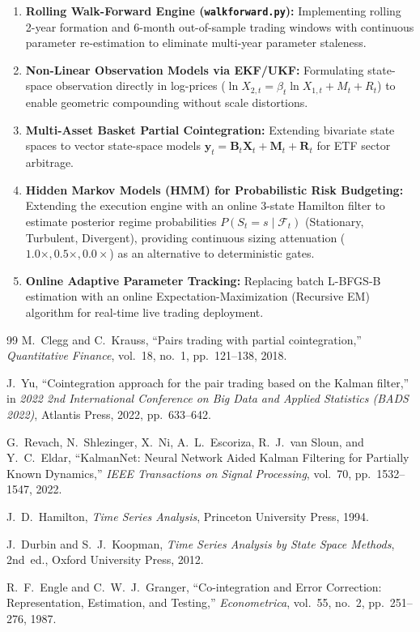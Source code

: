 \documentclass[11pt, a4paper]{article}
\begin{document}
\begin{enumerate}
    \item \textbf{Rolling Walk-Forward Engine (\texttt{walkforward.py}):} Implementing rolling 2-year formation and 6-month out-of-sample trading windows with continuous parameter re-estimation to eliminate multi-year parameter staleness.
    \item \textbf{Non-Linear Observation Models via EKF/UKF:} Formulating state-space observation directly in log-prices ($\ln X_{2,t} = \beta_t \ln X_{1,t} + M_t + R_t$) to enable geometric compounding without scale distortions.
    \item \textbf{Multi-Asset Basket Partial Cointegration:} Extending bivariate state spaces to vector state-space models $\mathbf{y}_t = \mathbf{B}_t \mathbf{X}_t + \mathbf{M}_t + \mathbf{R}_t$ for ETF sector arbitrage.
    \item \textbf{Hidden Markov Models (HMM) for Probabilistic Risk Budgeting:} Extending the execution engine with an online 3-state Hamilton filter to estimate posterior regime probabilities $P(S_t = s \mid \mathcal{F}_t)$ (Stationary, Turbulent, Divergent), providing continuous sizing attenuation ($1.0\times, 0.5\times, 0.0\times$) as an alternative to deterministic gates.
    \item \textbf{Online Adaptive Parameter Tracking:} Replacing batch L-BFGS-B estimation with an online Expectation-Maximization (Recursive EM) algorithm for real-time live trading deployment.
\end{enumerate}

\begin{thebibliography}{99}
M.~Clegg and C.~Krauss, ``Pairs trading with partial cointegration,'' \textit{Quantitative Finance}, vol.~18, no.~1, pp.~121--138, 2018.

J.~Yu, ``Cointegration approach for the pair trading based on the Kalman filter,'' in \textit{2022 2nd International Conference on Big Data and Applied Statistics (BADS 2022)}, Atlantis Press, 2022, pp.~633--642.

G.~Revach, N.~Shlezinger, X.~Ni, A.~L.~Escoriza, R.~J.~van Sloun, and Y.~C.~Eldar, ``KalmanNet: Neural Network Aided Kalman Filtering for Partially Known Dynamics,'' \textit{IEEE Transactions on Signal Processing}, vol.~70, pp.~1532--1547, 2022.

J.~D.~Hamilton, \textit{Time Series Analysis}, Princeton University Press, 1994.

J.~Durbin and S.~J.~Koopman, \textit{Time Series Analysis by State Space Methods}, 2nd~ed., Oxford University Press, 2012.

R.~F.~Engle and C.~W.~J.~Granger, ``Co-integration and Error Correction: Representation, Estimation, and Testing,'' \textit{Econometrica}, vol.~55, no.~2, pp.~251--276, 1987.

\end{thebibliography}
\end{document}
